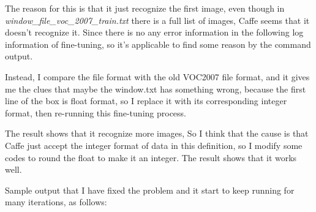 \documentclass[a4]{article}
\begin{document}
The reason for this is that it just recognize the first image, even though in \emph{window\_file\_voc\_2007\_train.txt} there is a full list of images, Caffe seems that it doesn't recognize it. Since there is no any error information in the following log information of fine-tuning, so it's applicable to find some reason by the command output.

Instead, I compare the file format with the old VOC2007 file format, and it gives me the clues that maybe the window.txt has something wrong, because the first line of the box is float format, so I replace it with its corresponding integer format, then re-running this fine-tuning process.

The result shows that it recognize more images, So I think that the cause is that Caffe just accept the integer format of data in this definition, so I modify some codes to round the float to make it an integer. The result shows that it works well.


Sample output that I have fixed the problem and it start to keep running for many iterations, as follows:
\end{document}
